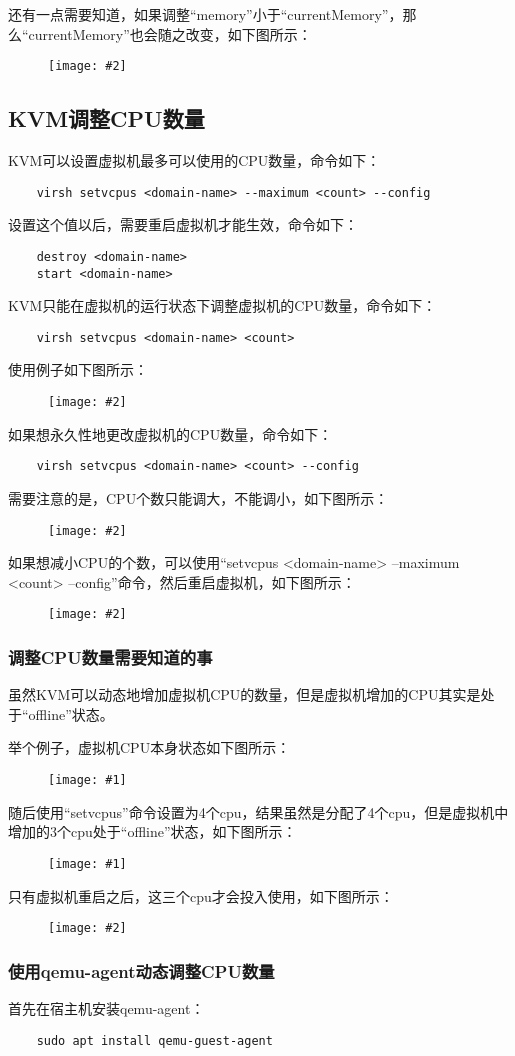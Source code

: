 \documentclass[a4paper,left=2.5cm,right=2.5cm,11pt]{article}
\newcommand{\fic}[1]{\begin{figure}[H]
		\center
		\texttt{[image: \#1]}
	\end{figure}}
\newcommand{\sizedfic}[2]{\begin{figure}[H]
		\center
		\texttt{[image: \#2]}
	\end{figure}}
\begin{document}
	还有一点需要知道，如果调整“memory”小于“currentMemory”，那么“currentMemory”也会随之改变，如下图所示：
	\sizedfic{0.5}{6.png}

\subsection{KVM调整CPU数量}
	KVM可以设置虚拟机最多可以使用的CPU数量，命令如下：
	\begin{lstlisting}
	virsh setvcpus <domain-name> --maximum <count> --config
	\end{lstlisting}

	设置这个值以后，需要重启虚拟机才能生效，命令如下：
	\begin{lstlisting}
	destroy <domain-name>
	start <domain-name>
	\end{lstlisting}

	KVM只能在虚拟机的运行状态下调整虚拟机的CPU数量，命令如下：
	\begin{lstlisting}
	virsh setvcpus <domain-name> <count>
	\end{lstlisting}

	使用例子如下图所示：
	\sizedfic{0.5}{7.png}

	如果想永久性地更改虚拟机的CPU数量，命令如下：
	\begin{lstlisting}
	virsh setvcpus <domain-name> <count> --config
	\end{lstlisting}

	需要注意的是，CPU个数只能调大，不能调小，如下图所示：
	\sizedfic{0.5}{8.png}

	如果想减小CPU的个数，可以使用“setvcpus <domain-name> --maximum <count> --config”命令，然后重启虚拟机，如下图所示：
	\sizedfic{0.6}{9.png}

\clearpage

\subsubsection{调整CPU数量需要知道的事}
	虽然KVM可以动态地增加虚拟机CPU的数量，但是虚拟机增加的CPU其实是处于“offline”状态。\par
	举个例子，虚拟机CPU本身状态如下图所示：
	\fic{10.png}

	随后使用“setvcpus”命令设置为4个cpu，结果虽然是分配了4个cpu，但是虚拟机中增加的3个cpu处于“offline”状态，如下图所示：
	\fic{11.png}

	只有虚拟机重启之后，这三个cpu才会投入使用，如下图所示：
	\sizedfic{0.5}{12.png}

\subsubsection{使用qemu-agent动态调整CPU数量}
	首先在宿主机安装qemu-agent：
	\begin{lstlisting}
	sudo apt install qemu-guest-agent
	\end{lstlisting}
\end{document}
